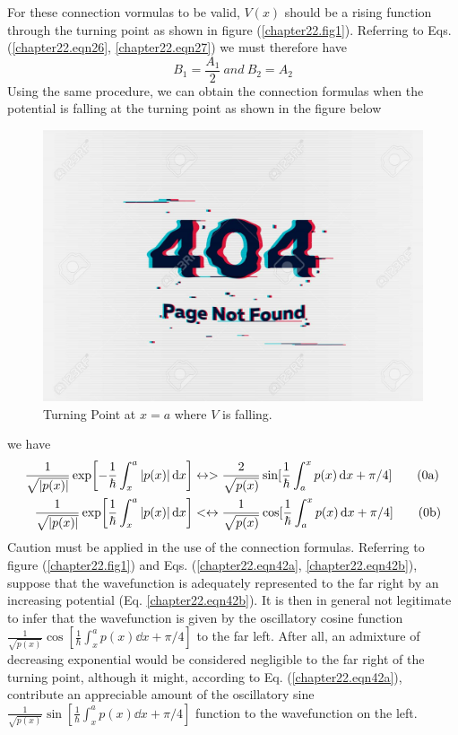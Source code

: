 For these connection vormulas to be valid, $V(x)$ should be a rising function  through the turning point as shown in figure (\ref{chapter22.fig1}). Referring to Eqs. (\ref{chapter22.eqn26}, \ref{chapter22.eqn27}) we must therefore have
\begin{equation}
B_1 = \frac{A_1}{2} \ and \ B_2 = A_2
\end{equation}
Using the same procedure, we can obtain the connection formulas when the potential is falling at the turning point as shown in the figure below


\begin{figure}
	\centering
	\includegraphics[width=0.5\linewidth]{Pictures/not-found.jpg}
	\caption{Turning Point at $x=a$ where $V$ is falling.}
	\label{chapter22.fig3}
\end{figure}

we have
\begin{align}
\frac{1}{\sqrt{\abs{p(x)}}} \exp[-\frac{1}{\hbar}\int_{x}^{a} \abs{p(x)} \dd{x}] &\leftrightarrow > \frac{2}{\sqrt{p(x)}} \sin[\frac{1}{\hbar}\int_{a}^{x} p(x) \dd{x} + \pi/4] \label{chapter22.eqn43a}
\tag{\theequation a} \\
\frac{1}{\sqrt{\abs{p(x)}}} \exp[\frac{1}{\hbar}\int_{x}^{a} \abs{p(x)} \dd{x}] &<\leftrightarrow  \frac{1}{\sqrt{p(x)}} \cos[\frac{1}{\hbar}\int_{a}^{x} p(x) \dd{x} + \pi/4] \label{chapter22.eqn43b}
\tag{\theequation b} \\
\end{align}
Caution must be applied in the use of the connection formulas. Referring to figure (\ref{chapter22.fig1}) and Eqs. (\ref{chapter22.eqn42a}, \ref{chapter22.eqn42b}), suppose that the wavefunction is adequately represented to the far right by an increasing potential (Eq. \ref{chapter22.eqn42b}). It is then in general not legitimate to infer that the wavefunction is given by the oscillatory cosine function $\frac{1}{\sqrt{p(x)}} \cos[\frac{1}{\hbar}\int_{x}^{a} p(x) \dd{x} + \pi/4]$ to the far left. After all, 
an admixture of decreasing exponential would be considered negligible to the far right of the turning point, although it might, according to Eq. (\ref{chapter22.eqn42a}), contribute an appreciable amount of the oscillatory sine 
$\frac{1}{\sqrt{p(x)}} \sin[\frac{1}{\hbar}\int_{x}^{a} p(x) \dd{x} + \pi/4]$
function to the wavefunction on the left.\\

